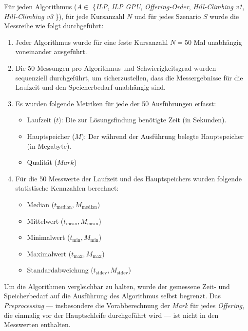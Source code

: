 
Für jeden Algorithmus ($A \in$ \{\textit{ILP}, \textit{ILP GPU}, \textit{Offering-Order}, \textit{Hill-Climbing v1}, \textit{Hill-Climbing v3} \}), für jede Kursanzahl $N$ und für jedes Szenario $S$ wurde die Messreihe wie folgt durchgeführt:

\begin{enumerate}
  \item Jeder Algorithmus wurde für eine feste Kursanzahl $N=50$ Mal unabhängig voneinander ausgeführt.
  \item Die 50 Messungen pro Algorithmus und Schwierigkeitsgrad wurden sequenziell durchgeführt, um sicherzustellen, dass die Messergebnisse für die Laufzeit und den Speicherbedarf unabhängig sind.
  \item Es wurden folgende Metriken für jede der 50 Ausführungen erfasst:
        \begin{itemize}
          \item Laufzeit ($\mathit{t}$): Die zur Lösungsfindung benötigte Zeit (in Sekunden).
          \item Hauptspeicher ($\mathit{M}$): Der während der Ausführung belegte Hauptspeicher (in Megabyte).
          \item Qualität ($\mathit{Mark}$)
        \end{itemize}
  \item Für die 50 Messwerte der Laufzeit und des Hauptspeichers wurden folgende statistische Kennzahlen berechnet:
        \begin{itemize}
          \item Median ($t_{\text{median}}, M_{\text{median}}$)
          \item Mittelwert ($t_{\text{mean}}, M_{\text{mean}}$)
          \item Minimalwert ($t_{\text{min}}, M_{\text{min}}$)
          \item Maximalwert ($t_{\text{max}}, M_{\text{max}}$)
          \item Standardabweichung ($t_{\text{stdev}}, M_{\text{stdev}}$)
        \end{itemize}
\end{enumerate}


Um die Algorithmen vergleichbar zu halten, wurde der gemessene Zeit- und Speicherbedarf auf die Ausführung des Algorithmus selbst begrenzt. Das \textit{Preprocessing} — insbesondere die Vorabberechnung der \textit{Mark} für jedes \textit{Offering}, die einmalig vor der Hauptschleife durchgeführt wird — ist nicht in den Messwerten enthalten.

